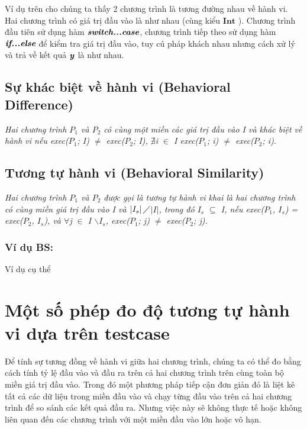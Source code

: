Ví dụ trên cho chúng ta thấy 2 chương trình là tương đường nhau về hành vi. Hai chương trình có giá trị đầu vào là như nhau (cùng kiểu $\textbf{Int}$ ). Chương trình đầu tiên sử dụng hàm $\textit{\textbf{switch...case}}$, chương trình tiếp theo sử dụng hàm $\textit{\textbf{if...else}}$ để kiểm tra giá trị đầu vào, tuy cú pháp khách nhau nhưng cách xử lý và trả về kết quả $\textbf{\textit{y}}$ là như nhau. 
	
\subsection{Sự khác biệt về hành vi (Behavioral Difference)}
	\textit{Hai chương trình $P_{1}$ và $P_{2}$ có cùng một miền các giá trị đầu vào I và khác biệt về hành vi nếu exec($P_{1}$; I) $\neq$ exec($P_{2}$; I), $\nexists$i $\in$ I exec($P_{1}$; i) $\neq$ exec($P_{2}$; i)}.
	
\subsection{Tương tự hành vi (Behavioral Similarity)}
	\textit{Hai chương trình $P_{1}$ và $P_{2}$ được gọi là tương tự hành vi khai là hai chương trình có cùng miền giá trị đầu vào I và $\left|I_{s}\right|\diagup$$\left|I\right|$, trong đó $I_{s}$ $\subseteq $ I, nếu exec($P_{1}$, $I_{s}$) = exec($P_{2}$, $I_{s}$), và $\forall$j $\in$ I $\backslash$$I_{s}$, exec($P_{1}$; j) $\neq$ exec($P_{2}$; j).}

\subsubsection{Ví dụ BS:}
	Ví dụ cụ thể
	


\section{Một số phép đo độ tương tự hành vi dựa trên testcase}
Để tính sự tương đồng về hành vi giữa hai chương trình, chúng ta có thể đo bằng cách tính tỷ lệ đầu vào và đầu ra trên cả hai chương trình trên cùng toàn bộ miền giá trị đầu vào. Trong đó một phương pháp tiếp cận đơn giản đó là liệt kê tất cả các dữ liệu trong miền đầu vào và chạy từng đầu vào trên cả hai chương trình để so sánh các kết quả đầu ra. Nhưng việc này sẽ không thực tế hoặc không liên quan đến các chương trình với một miền đầu vào lớn hoặc vô hạn. \\
	

